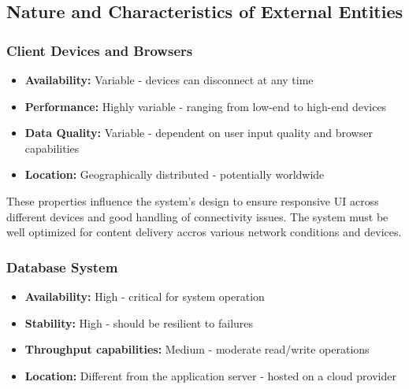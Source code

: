 \subsection{Nature and Characteristics of External Entities}

\subsubsection{Client Devices and Browsers}



\begin{itemize}
    \item \textbf{Availability:} Variable - devices can disconnect at any time
    \item \textbf{Performance:} Highly variable - ranging from low-end to high-end devices
    \item \textbf{Data Quality:} Variable - dependent on user input quality and browser capabilities
    \item \textbf{Location:} Geographically distributed - potentially worldwide
\end{itemize}

These properties influence the system's design to ensure responsive UI across
different devices and good handling of connectivity issues. The system must be
well optimized for content delivery accros various network conditions and
devices.

\subsubsection{Database System}


\begin{itemize}
    \item \textbf{Availability:} High - critical for system operation
    \item \textbf{Stability:} High - should be resilient to failures
    \item \textbf{Throughput capabilities:} Medium - moderate read/write operations
    \item \textbf{Location:} Different from the application server - hosted on a cloud provider
\end{itemize}

